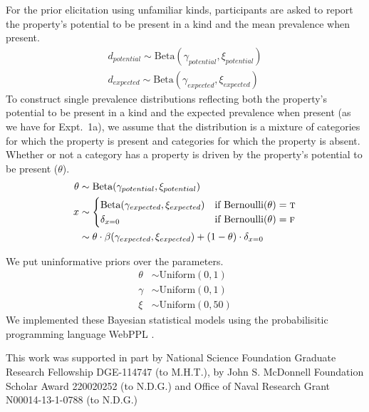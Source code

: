 \documentclass{pnastwo}
\begin{document}
\begin{article}
\begin{materials}
For the prior elicitation using unfamiliar kinds, participants are asked to report the property's potential to be present in a kind and the mean prevalence when present. 
\begin{align*}
d_{potential} \sim \text{Beta}(\gamma_{potential}, \xi_{potential}) \\
d_{expected} \sim \text{Beta}(\gamma_{expected}, \xi_{expected}) 
\end{align*}
To construct single prevalence distributions reflecting both the property's potential to be present in a kind and the expected prevalence when present (as we have for Expt.~1a), we assume that the distribution is a mixture of categories for which the property is present and categories for which the property is absent.
Whether or not a category has a property is driven by the property's potential to be present ($\theta$).
\begin{align*}
\theta & \sim \text{Beta}(\gamma_{potential}, \xi_{potential}) \\ 
x & \sim \begin{cases} 
		\text{Beta}(\gamma_{expected}, \xi_{expected}) &\mbox{if } \text{Bernoulli}(\theta) = \textsc{t} \\
				\delta_{x=0} &\mbox{if } \text{Bernoulli}(\theta) = \textsc{f} \\
		\end{cases} \\
	 &  \sim \theta \cdot \beta(\gamma_{expected},\xi_{expected}) + (1-\theta)  \cdot \delta_{x=0}
\end{align*}

We put uninformative priors over the parameters.
\begin{align*}
\theta & \sim \text{Uniform}(0,1) \\
\gamma & \sim \text{Uniform}(0,1) \\
\xi & \sim \text{Uniform}(0, 50)
\end{align*}
We implemented these Bayesian statistical models using the probabilisitic programming language WebPPL \cite{dippl}. 
\end{materials}


\begin{acknowledgments}
This work was supported in part by National Science Foundation Graduate Research Fellowship DGE-114747 (to M.H.T.),
by John S. McDonnell Foundation Scholar Award 220020252 (to N.D.G.) and 
Office of Naval Research Grant N00014-13-1-0788 (to N.D.G.)



\end{acknowledgments}
\end{article}
\end{document}
